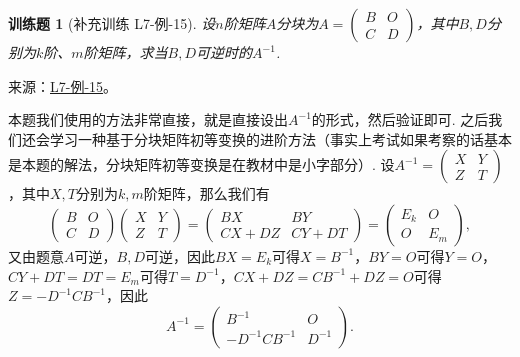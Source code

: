 \documentclass[UTF8,12pt,a4paper,fontset=fandol]{ctexart}
\newtheorem{exercise}{训练题}[section]
\begin{document}
\begin{exercise}[补充训练 L7-例-15]\label{prob:L7-例-15}
设$n$阶矩阵$A$分块为$A=\begin{pmatrix}
                      B & O \\ C & D
                  \end{pmatrix}$，其中$B,D$分别为$k$阶、$m$阶矩阵，求当$B,D$可逆时的$A^{-1}$.
\end{exercise}
\noindent 来源：\href{https://github.com/yhwu-is/Linear-Algebra-Left-Undone/blob/new/%E8%AE%B2%E4%B9%89/%E4%B8%93%E9%A2%98/7%20%E7%BA%BF%E6%80%A7%E6%98%A0%E5%B0%84%E7%9F%A9%E9%98%B5%E8%A1%A8%E7%A4%BA%E4%B8%8E%E7%9F%A9%E9%98%B5%E8%BF%90%E7%AE%97%E5%9F%BA%E7%A1%80.tex}{L7-例-15}。
\begin{solve}
本题我们使用的方法非常直接，就是直接设出$A^{-1}$的形式，然后验证即可. 之后我们还会学习一种基于分块矩阵初等变换的进阶方法（事实上考试如果考察的话基本是本题的解法，分块矩阵初等变换是在教材中是小字部分）. 设$A^{-1}=\begin{pmatrix}
                      X & Y \\ Z & T
                  \end{pmatrix}$，其中$X,T$分别为$k,m$阶矩阵，那么我们有
              \[\begin{pmatrix}
                      B & O \\ C & D
                  \end{pmatrix}\begin{pmatrix}
                      X & Y \\ Z & T
                  \end{pmatrix}=\begin{pmatrix}
                      BX & BY \\ CX+DZ & CY+DT
                  \end{pmatrix}=\begin{pmatrix}
                      E_k & O \\ O & E_m
                  \end{pmatrix},\]
              又由题意$A$可逆，$B,D$可逆，因此$BX=E_k$可得$X=B^{-1}$，$BY=O$可得$Y=O$，$CY+DT=DT=E_m$可得$T=D^{-1}$，$CX+DZ=CB^{-1}+DZ=O$可得$Z=-D^{-1}CB^{-1}$，因此
              \[A^{-1}=\begin{pmatrix}
                      B^{-1} & O \\ -D^{-1}CB^{-1} & D^{-1}
                  \end{pmatrix}.\]
\end{solve}
\end{document}
